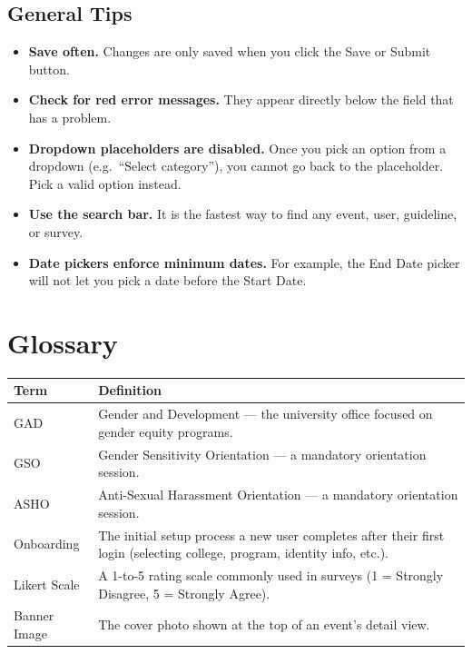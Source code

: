 \documentclass[12pt, a4paper]{article}
\begin{document}
\subsection{General Tips}
\begin{itemize}[leftmargin=1.5em]
  \item \textbf{Save often.} Changes are only saved when you click the Save or Submit button.
  \item \textbf{Check for red error messages.} They appear directly below the field that has a problem.
  \item \textbf{Dropdown placeholders are disabled.} Once you pick an option from a dropdown (e.g.\ ``Select category''), you cannot go back to the placeholder. Pick a valid option instead.
  \item \textbf{Use the search bar.} It is the fastest way to find any event, user, guideline, or survey.
  \item \textbf{Date pickers enforce minimum dates.} For example, the End Date picker will not let you pick a date before the Start Date.
\end{itemize}

\newpage
\section{Glossary}

\begin{longtable}{|>{\raggedright\arraybackslash}p{4cm}|>{\raggedright\arraybackslash}p{9cm}|}
\hline
\rowcolor{lightgray}
\textbf{Term} & \textbf{Definition} \\
\hline
GAD & Gender and Development — the university office focused on gender equity programs. \\
\hline
GSO & Gender Sensitivity Orientation — a mandatory orientation session. \\
\hline
ASHO & Anti-Sexual Harassment Orientation — a mandatory orientation session. \\
\hline
Onboarding & The initial setup process a new user completes after their first login (selecting college, program, identity info, etc.). \\
\hline
Likert Scale & A 1-to-5 rating scale commonly used in surveys (1 = Strongly Disagree, 5 = Strongly Agree). \\
\hline
Banner Image & The cover photo shown at the top of an event's detail view. \\
\hline
\end{longtable}
\end{document}
